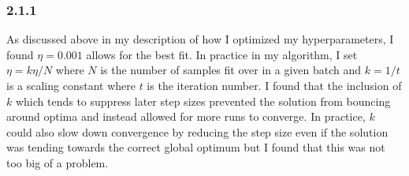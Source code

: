 \documentclass[12pt]{amsart}
\begin{document}
\subsubsection*{2.1.1}
As discussed above in my description of how I optimized my hyperparameters, I found $\eta = 0.001$ allows for the best fit.  In practice in my algorithm, I set $\eta = k\eta/N$ where $N$ is the number of samples fit over in a given batch and $k = 1/t$ is a scaling constant where $t$ is the iteration number.  I found that the inclusion of $k$ which tends to suppress later step sizes prevented the solution from bouncing around optima and instead allowed for more runs to converge.  In practice, $k$ could also slow down convergence by reducing the step size even if the solution was tending towards the correct global optimum but I found that this was not too big of a problem.
\end{document}
